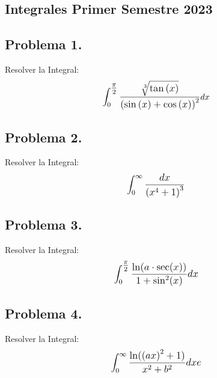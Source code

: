 
\begin{center}
    \section{Integrales Primer Semestre 2023}
\end{center}

\begin{CajaTitulo}{\begin{center}\subsection*{Problema 1.}\end{center}}
    Resolver la Integral: \[\mathlarger{\int_{0}^{\mathlarger{\frac{\pi}{2}}}\frac{\sqrt[3]{\tan{(x)}}}{{(\sin{(x)}+\cos{(x)})}^2}}dx\]

\end{CajaTitulo}

\begin{CajaTitulo}{\begin{center}\subsection*{Problema 2.}\end{center}}
    Resolver la Integral: \[\mathlarger{\int_{0}^{\infty}\frac{dx}{ {(x^4 +1)}^3}}\]
\end{CajaTitulo}

\begin{CajaTitulo}{\begin{center}\subsection*{Problema 3.}\end{center}}
    Resolver la Integral: \[\mathlarger{\int_{0}^{\mathlarger{\frac{\pi}{2}}}\frac{\ln(a \cdot \sec(x))}{1 + \sin^2(x)}dx}\]
\end{CajaTitulo}

\begin{CajaTitulo}{\begin{center}\subsection*{Problema 4.}\end{center}}
    Resolver la Integral: \[\mathlarger{\int_{0}^{\infty}\frac{\ln({(ax)}^2 + 1)}{x^2 + b^2}dxe}\]
\end{CajaTitulo}

